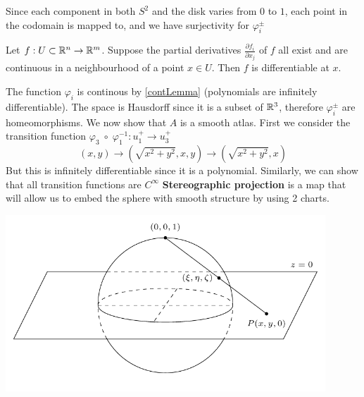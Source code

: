 \documentclass[11pt,a4paper]{report}
\begin{document}
Since each component in both $S^2$ and the disk varies from $0$ to $1$, each point in the codomain is mapped to, and we have surjectivity for $\varphi_i^{\pm}$
\newline
\begin{Lemma}\label{contLemma}
  Let $f:U \subset \mathbb{R}^n \to \mathbb{R}^m $. Suppose the partial derivatives $\frac{\partial f_i}{\partial x_j}$ of $f$ all exist
  and are continuous in a neighbourhood of a point $x \in U$. Then $f$ is differentiable at $x$. 
\end{Lemma}
The function $\varphi_i$ is continous by \ref{contLemma} (polynomials are infinitely differentiable).
\newline
The space is Hausdorff since it is a subset of $\mathbb{R}^3$, therefore $\varphi_{i}^{\pm}$ are homeomorphisms.
\newline
We now show that $A$ is a smooth atlas. First we consider the transition function $ \varphi_3 \; \circ \; \varphi_1^{-1}: u_1^{+} \to u_3^{+}$
$$(x,y) \to (\sqrt{x^2+y^2},x,y) \to (\sqrt{x^2+y^2},x)$$
But this is infinitely differentiable since it is a polynomial. Similarly, we can show that all transition functions are $C^{\infty}$
\newline
\newline
\textbf{Stereographic projection} is a map that will allow us to embed the sphere with smooth structure by using 2 charts.
\newline
\begin{center}
      \centering
      \includegraphics[width=0.90\textwidth]{stereographic_projection.png}
\end{center}
\end{document}
